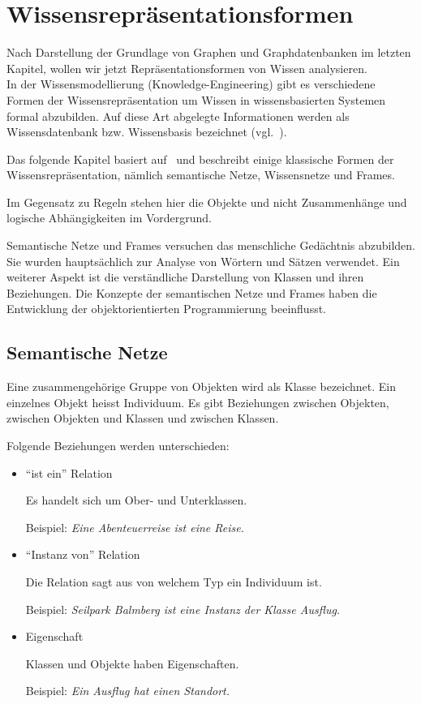 \chapter{Wissensrepräsentationsformen}
\label{chap:wissensrepFormen}

Nach Darstellung der Grundlage von Graphen und Graphdatenbanken im letzten Kapitel, wollen wir jetzt Repräsentationsformen von Wissen analysieren.\\
In der Wissensmodellierung (Knowledge-Engineering) gibt es verschiedene Formen der Wissensrepräsentation um Wissen in wissensbasierten Systemen formal abzubilden. Auf diese Art abgelegte Informationen werden als Wissensdatenbank bzw. Wissensbasis bezeichnet (vgl.~\cite{wikiWissensrep}).

Das folgende Kapitel basiert auf~\cite[S. 85 - 90]{laemmel} und beschreibt einige klassische Formen der Wissensrepräsentation, nämlich semantische Netze, Wissensnetze und Frames.

Im Gegensatz zu Regeln stehen hier die Objekte und nicht Zusammenhänge und logische Abhängigkeiten im Vordergrund.

Semantische Netze und Frames versuchen das menschliche Gedächtnis abzubilden. Sie wurden hauptsächlich zur Analyse von Wörtern und Sätzen verwendet. Ein weiterer Aspekt ist die verständliche Darstellung von Klassen und ihren Beziehungen. Die Konzepte der semantischen Netze und Frames haben die Entwicklung der objektorientierten Programmierung beeinflusst.

\section{Semantische Netze}
\label{sec:wissensrepFormen_semantischeNetze}

Eine zusammengehörige Gruppe von Objekten wird als Klasse bezeichnet. Ein einzelnes Objekt heisst Individuum. Es gibt Beziehungen zwischen Objekten, zwischen Objekten und Klassen und zwischen Klassen.

Folgende Beziehungen werden unterschieden:
\begin{itemize}
    \item ``ist ein'' Relation

        Es handelt sich um Ober- und Unterklassen.

        Beispiel: \textit{Eine Abenteuerreise ist eine Reise.}

    \item ``Instanz von'' Relation

        Die Relation sagt aus von welchem Typ ein Individuum ist.

        Beispiel: \textit{Seilpark Balmberg ist eine Instanz der Klasse Ausflug.}

    \item Eigenschaft

        Klassen und Objekte haben Eigenschaften.

        Beispiel: \textit{Ein Ausflug hat einen Standort.}
\end{itemize}

